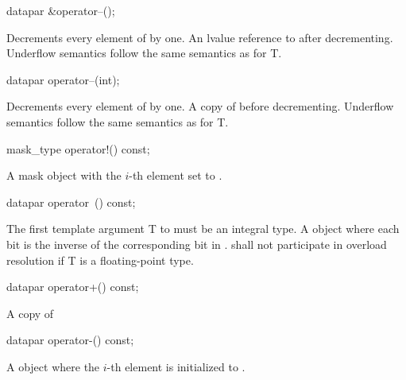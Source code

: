 \begin{itemdecl}
datapar &operator--();
\end{itemdecl}
\begin{itemdescr}
  \pnum\effects Decrements every element of  by one.
  \pnum\returns An lvalue reference to  after decrementing.
  \pnum\remarks Underflow semantics follow the same semantics as for \type T.
\end{itemdescr}

\begin{itemdecl}
datapar operator--(int);
\end{itemdecl}
\begin{itemdescr}
  \pnum\effects Decrements every element of  by one.
  \pnum\returns A copy of  before decrementing.
  \pnum\remarks Underflow semantics follow the same semantics as for \type T.
\end{itemdescr}

\begin{itemdecl}
mask_type operator!() const;
\end{itemdecl}
\begin{itemdescr}
  \pnum\returns A mask object with the $i$-th element set to  \foralli.
\end{itemdescr}

\begin{itemdecl}
datapar operator~() const;
\end{itemdecl}
\begin{itemdescr}
  \pnum\requires The first template argument \type T to \datapar must be an integral type.
  \pnum\returns A \datapar object where each bit is the inverse of the corresponding bit in .
  \pnum\remarks \datapar{} shall not participate in overload resolution if \type T is a floating-point type.
\end{itemdescr}

\begin{itemdecl}
datapar operator+() const;
\end{itemdecl}
\begin{itemdescr}
  \pnum \returns A copy of 
\end{itemdescr}

\begin{itemdecl}
datapar operator-() const;
\end{itemdecl}
\begin{itemdescr}
  \pnum\returns A \datapar object where the $i$-th element is initialized to  \foralli.
\end{itemdescr}

